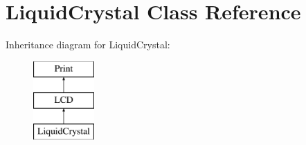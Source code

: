 \hypertarget{class_liquid_crystal}{}\section{Liquid\+Crystal Class Reference}
\label{class_liquid_crystal}
Inheritance diagram for Liquid\+Crystal\+:\begin{figure}[H]
\begin{center}
\leavevmode
\includegraphics[height=3.000000cm]{class_liquid_crystal}
\end{center}
\end{figure}
